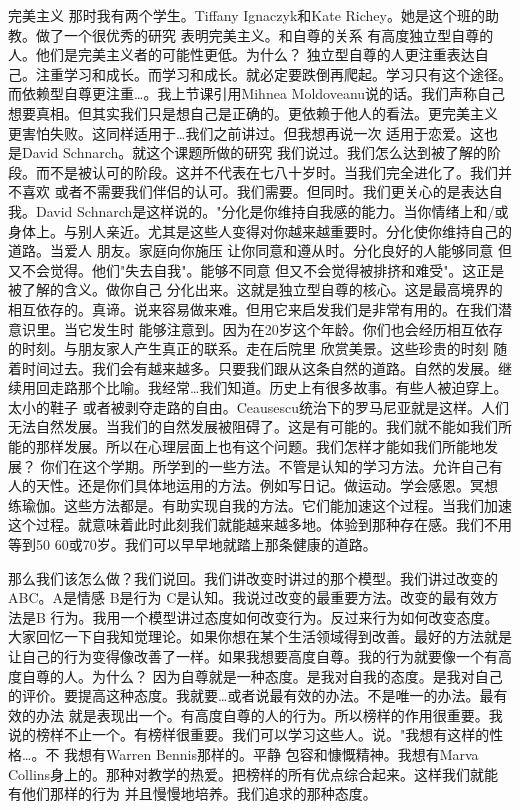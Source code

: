 完美主义 那时我有两个学生。Tiffany Ignaczyk和Kate Richey。她是这个班的助教。做了一个很优秀的研究 表明完美主义。和自尊的关系 有高度独立型自尊的人。他们是完美主义者的可能性更低。为什么？ 独立型自尊的人更注重表达自己。注重学习和成长。而学习和成长。就必定要跌倒再爬起。学习只有这个途径。而依赖型自尊更注重…。我上节课引用Mihnea Moldoveanu说的话。我们声称自己想要真相。但其实我们只是想自己是正确的。更依赖于他人的看法。更完美主义 更害怕失败。这同样适用于…我们之前讲过。但我想再说一次 适用于恋爱。这也是David Schnarch。就这个课题所做的研究 我们说过。我们怎么达到被了解的阶段。而不是被认可的阶段。这并不代表在七八十岁时。当我们完全进化了。我们并不喜欢 或者不需要我们伴侣的认可。我们需要。但同时。我们更关心的是表达自我。David Schnarch是这样说的。"分化是你维持自我感的能力。当你情绪上和/或身体上。与别人亲近。尤其是这些人变得对你越来越重要时。分化使你维持自己的道路。当爱人 朋友。家庭向你施压 让你同意和遵从时。分化良好的人能够同意 但又不会觉得。他们"失去自我"。能够不同意 但又不会觉得被排挤和难受"。这正是被了解的含义。做你自己 分化出来。这就是独立型自尊的核心。这是最高境界的相互依存的。真谛。说来容易做来难。但用它来启发我们是非常有用的。在我们潜意识里。当它发生时 能够注意到。因为在20岁这个年龄。你们也会经历相互依存的时刻。与朋友家人产生真正的联系。走在后院里 欣赏美景。这些珍贵的时刻 随着时间过去。我们会有越来越多。只要我们跟从这条自然的道路。自然的发展。继续用回走路那个比喻。我经常…我们知道。历史上有很多故事。有些人被迫穿上。太小的鞋子 或者被剥夺走路的自由。Ceausescu统治下的罗马尼亚就是这样。人们无法自然发展。当我们的自然发展被阻碍了。这是有可能的。我们就不能如我们所能的那样发展。所以在心理层面上也有这个问题。我们怎样才能如我们所能地发展？ 你们在这个学期。所学到的一些方法。不管是认知的学习方法。允许自己有人的天性。还是你们具体地运用的方法。例如写日记。做运动。学会感恩。冥想 练瑜伽。这些方法都是。有助实现自我的方法。它们能加速这个过程。当我们加速这个过程。就意味着此时此刻我们就能越来越多地。体验到那种存在感。我们不用等到50 60或70岁。我们可以早早地就踏上那条健康的道路。 

那么我们该怎么做？我们说回。我们讲改变时讲过的那个模型。我们讲过改变的ABC。A是情感 B是行为 C是认知。我说过改变的最重要方法。改变的最有效方法是B 行为。我用一个模型讲过态度如何改变行为。反过来行为如何改变态度。大家回忆一下自我知觉理论。如果你想在某个生活领域得到改善。最好的方法就是让自己的行为变得像改善了一样。如果我想要高度自尊。我的行为就要像一个有高度自尊的人。为什么？ 因为自尊就是一种态度。是我对自我的态度。是我对自己的评价。要提高这种态度。我就要…或者说最有效的办法。不是唯一的办法。最有效的办法 就是表现出一个。有高度自尊的人的行为。所以榜样的作用很重要。我说的榜样不止一个。有榜样很重要。我们可以学习这些人。说。"我想有这样的性格…。不 我想有Warren Bennis那样的。平静 包容和慷慨精神。我想有Marva Collins身上的。那种对教学的热爱。把榜样的所有优点综合起来。这样我们就能有他们那样的行为 并且慢慢地培养。我们追求的那种态度。 

